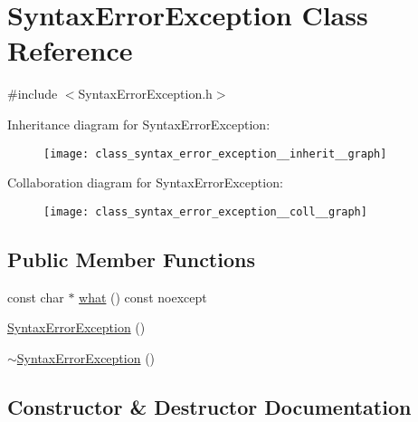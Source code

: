 \hypertarget{class_syntax_error_exception}{}\section{Syntax\+Error\+Exception Class Reference}
\label{class_syntax_error_exception}


{\ttfamily \#include $<$Syntax\+Error\+Exception.\+h$>$}



Inheritance diagram for Syntax\+Error\+Exception\+:
\nopagebreak
\begin{figure}[H]
\begin{center}
\leavevmode
\texttt{[image: class\_syntax\_error\_exception\_\_inherit\_\_graph]}
\end{center}
\end{figure}


Collaboration diagram for Syntax\+Error\+Exception\+:
\nopagebreak
\begin{figure}[H]
\begin{center}
\leavevmode
\texttt{[image: class\_syntax\_error\_exception\_\_coll\_\_graph]}
\end{center}
\end{figure}
\subsection*{Public Member Functions}
\begin{DoxyCompactItemize}
\item 
const char $\ast$ \mbox{\hyperlink{class_syntax_error_exception_afbc1fad4470c9a2fa8b486ac68358835}{what}} () const noexcept
\item 
\mbox{\hyperlink{class_syntax_error_exception_af1af55db16cd19f22a581f082bcd1884}{Syntax\+Error\+Exception}} ()
\item 
\mbox{\hyperlink{class_syntax_error_exception_a367745682a61a7fea37fab27e0f24cbe}{$\sim$\+Syntax\+Error\+Exception}} ()
\end{DoxyCompactItemize}


\subsection{Constructor \& Destructor Documentation}
\mbox{\label{class_syntax_error_exception_af1af55db16cd19f22a581f082bcd1884}} 
